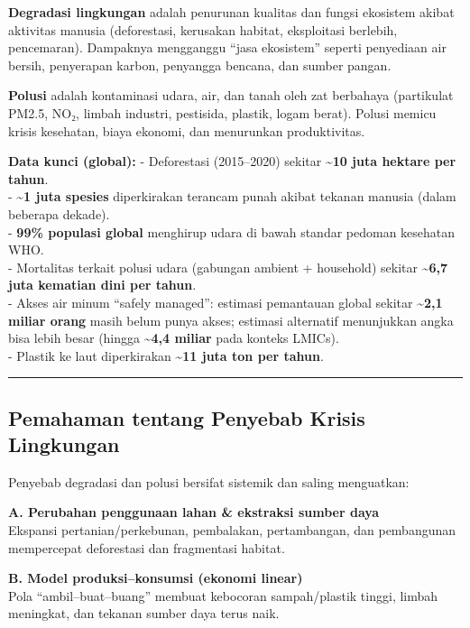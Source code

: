 \documentclass[
  letterpaper,
  DIV=11,
  numbers=noendperiod]{scrreprt}
\begin{document}
\textbf{Degradasi lingkungan} adalah penurunan kualitas dan fungsi
ekosistem akibat aktivitas manusia (deforestasi, kerusakan habitat,
eksploitasi berlebih, pencemaran). Dampaknya mengganggu ``jasa
ekosistem'' seperti penyediaan air bersih, penyerapan karbon, penyangga
bencana, dan sumber pangan.

\textbf{Polusi} adalah kontaminasi udara, air, dan tanah oleh zat
berbahaya (partikulat PM2.5, NO₂, limbah industri, pestisida, plastik,
logam berat). Polusi memicu krisis kesehatan, biaya ekonomi, dan
menurunkan produktivitas.

\textbf{Data kunci (global):} - Deforestasi (2015--2020) sekitar
\textbf{\textasciitilde10 juta hektare per tahun}.\\
- \textbf{\textasciitilde1 juta spesies} diperkirakan terancam punah
akibat tekanan manusia (dalam beberapa dekade).\\
- \textbf{99\% populasi global} menghirup udara di bawah standar pedoman
kesehatan WHO.\\
- Mortalitas terkait polusi udara (gabungan ambient + household) sekitar
\textbf{\textasciitilde6,7 juta kematian dini per tahun}.\\
- Akses air minum ``safely managed'': estimasi pemantauan global sekitar
\textbf{\textasciitilde2,1 miliar orang} masih belum punya akses;
estimasi alternatif menunjukkan angka bisa lebih besar (hingga
\textbf{\textasciitilde4,4 miliar} pada konteks LMICs).\\
- Plastik ke laut diperkirakan \textbf{\textasciitilde11 juta ton per
tahun}.

\begin{center}\rule{0.5\linewidth}{0.5pt}\end{center}

\subsection{Pemahaman tentang Penyebab Krisis
Lingkungan}\label{pemahaman-tentang-penyebab-krisis-lingkungan}

Penyebab degradasi dan polusi bersifat sistemik dan saling menguatkan:

\textbf{A. Perubahan penggunaan lahan \& ekstraksi sumber daya}\\
Ekspansi pertanian/perkebunan, pembalakan, pertambangan, dan pembangunan
mempercepat deforestasi dan fragmentasi habitat.

\textbf{B. Model produksi--konsumsi (ekonomi linear)}\\
Pola ``ambil--buat--buang'' membuat kebocoran sampah/plastik tinggi,
limbah meningkat, dan tekanan sumber daya terus naik.
\end{document}
